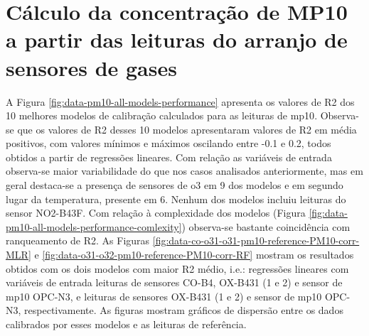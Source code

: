 \section{Cálculo da concentração de MP10 a partir das leituras do arranjo de sensores de gases}

A Figura \ref{fig:data-pm10-all-models-performance} apresenta os valores de R2 dos 10 melhores modelos de calibração calculados para as leituras de \acrshort{mp10}. Observa-se que os valores de R2 desses 10 modelos apresentaram valores de R2 em média positivos, com valores mínimos e máximos oscilando entre -0.1 e 0.2, todos obtidos a partir de regressões lineares. Com relação as variáveis de entrada observa-se maior variabilidade do que nos casos analisados anteriormente, mas em geral destaca-se a presença de sensores de \acrshort{o3} em 9 dos modelos e em segundo lugar da temperatura, presente em 6. Nenhum dos modelos incluiu leituras do sensor NO2-B43F. Com relação à complexidade dos modelos (Figura \ref{fig:data-pm10-all-models-performance-comlexity}) observa-se bastante coincidência com ranqueamento de R2. As Figuras \ref{fig:data-co-o31-o31-pm10-reference-PM10-corr-MLR} e \ref{fig:data-o31-o32-pm10-reference-PM10-corr-RF} mostram os resultados obtidos com os dois modelos com maior R2 médio, i.e.: regressões lineares com variáveis de entrada leituras de sensores CO-B4, OX-B431 (1 e 2) e sensor de \acrshort{mp10} OPC-N3, e leituras de sensores OX-B431 (1 e 2) e sensor de \acrshort{mp10} OPC-N3, respectivamente. As figuras mostram gráficos de dispersão entre os dados calibrados por esses modelos e as leituras de referência.

